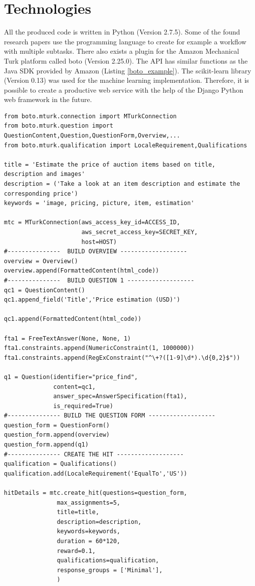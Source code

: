 \section{Technologies}
All the produced code is written in Python (Version 2.7.5). Some of the found research papers use the programming language to create for example a workflow with multiple subtasks. There also exists a plugin for the Amazon Mechanical Turk platform called boto (Version 2.25.0). The API has similar functions as the Java SDK provided by Amazon (Listing \ref{boto_example}). The scikit-learn library (Version 0.13) was used for the machine learning implementation. Therefore, it is possible to create a productive web service with the help of the Django Python web framework in the future.
\begin{lstlisting}
from boto.mturk.connection import MTurkConnection
from boto.mturk.question import QuestionContent,Question,QuestionForm,Overview,...
from boto.mturk.qualification import LocaleRequirement,Qualifications

title = 'Estimate the price of auction items based on title, description and images'
description = ('Take a look at an item description and estimate the corresponding price')
keywords = 'image, pricing, picture, item, estimation'

mtc = MTurkConnection(aws_access_key_id=ACCESS_ID,
                      aws_secret_access_key=SECRET_KEY,
                      host=HOST)
#---------------  BUILD OVERVIEW -------------------
overview = Overview()
overview.append(FormattedContent(html_code))
#---------------  BUILD QUESTION 1 -------------------
qc1 = QuestionContent()
qc1.append_field('Title','Price estimation (USD)')
 
qc1.append(FormattedContent(html_code))
 
fta1 = FreeTextAnswer(None, None, 1)
fta1.constraints.append(NumericConstraint(1, 1000000))          
fta1.constraints.append(RegExConstraint("^\+?([1-9]\d*).\d{0,2}$"))
 
q1 = Question(identifier="price_find",
              content=qc1,
              answer_spec=AnswerSpecification(fta1),
              is_required=True)
#--------------- BUILD THE QUESTION FORM -------------------
question_form = QuestionForm()
question_form.append(overview)
question_form.append(q1)
#--------------- CREATE THE HIT -------------------
qualification = Qualifications()
qualification.add(LocaleRequirement('EqualTo','US'))

hitDetails = mtc.create_hit(questions=question_form,
               max_assignments=5,
               title=title,
               description=description,
               keywords=keywords,
               duration = 60*120,
               reward=0.1,
               qualifications=qualification,
               response_groups = ['Minimal'],
               ) 
\end{lstlisting}
